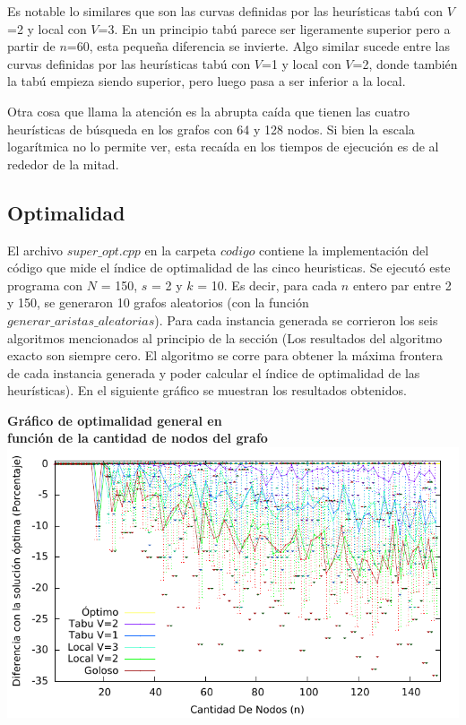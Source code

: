 \par{Es notable lo similares que son las curvas definidas por las heurísticas
tabú con $V$=2 y local con $V$=3. En un principio tabú parece ser ligeramente
superior pero a partir de $n$=60, esta pequeña diferencia se invierte. Algo
similar sucede entre las curvas definidas por las heurísticas tabú con $V$=1
y local con $V$=2, donde también la tabú empieza siendo superior, pero luego
pasa a ser inferior a la local.}\\

\par{Otra cosa que llama la atención es la abrupta caída que tienen las cuatro
heurísticas de búsqueda en los grafos con 64 y 128 nodos. Si bien la escala
logarítmica no lo permite ver, esta recaída en los tiempos de ejecución es
de al rededor de la mitad.}

\subsection{Optimalidad}

\par{El archivo $super\_opt.cpp$ en la carpeta $codigo$ contiene la
implementación del código que mide el índice de optimalidad de las cinco
heuristicas. Se ejecutó este programa con $N$ = 150, $s$ = 2 y $k$ = 10. Es
decir, para cada $n$ entero par entre 2 y 150, se generaron 10 grafos
aleatorios (con la función $generar\_aristas\_aleatorias$).
Para cada instancia generada se corrieron los seis algoritmos mencionados al
principio de la sección (Los resultados del algoritmo exacto son siempre
cero. El algoritmo se corre para obtener la máxima frontera de cada instancia
generada y poder calcular el índice de optimalidad de las heurísticas).
En el siguiente gráfico se muestran los resultados obtenidos.}

\begin{center}
\textbf{Gráfico de optimalidad general en\\función de la cantidad
de nodos del grafo}
\includegraphics[scale=1.3]{imgs/super_opt_150_2_10.pdf}
\end{center}

